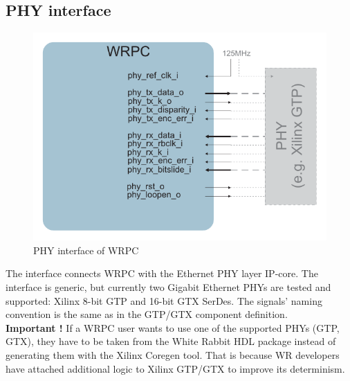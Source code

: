 \subsection{PHY interface}

\begin{figure}[ht]
  \begin{center}
    \includegraphics[width=.7\textwidth]{fig/wrpc_phyif.pdf}
    \caption{PHY interface of WRPC}
  \end{center}
\end{figure}

The interface connects WRPC with the Ethernet PHY layer IP-core. The interface is
generic, but currently two Gigabit Ethernet PHYs are tested and supported: Xilinx
8-bit GTP and 16-bit GTX SerDes. The signals' naming convention is the same as
in the GTP/GTX component definition.\\

{\bf Important !} If a WRPC user wants to use one of the supported PHYs (GTP,
GTX), they have to be taken from the White Rabbit HDL package instead of generating
them with the Xilinx Coregen tool. That is because WR developers have attached
additional logic to Xilinx GTP/GTX to improve its determinism.\\
